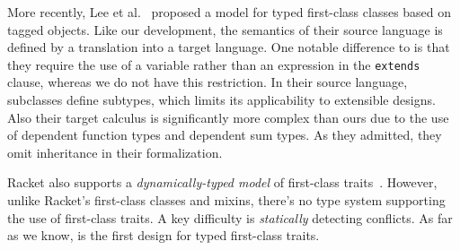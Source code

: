 More recently, Lee et al.~\citep{DBLP:conf/ecoop/LeeASP15} proposed a model for typed first-class
classes based on tagged objects. Like our development, the semantics
of their source language is defined by a translation into a target language.
One notable difference to \name is that they require the use of a variable
rather than an expression in the \lstinline{extends} clause, whereas we do not
have this restriction. In their source language, subclasses define subtypes,
which limits its applicability to extensible designs. Also their target calculus is significantly more complex
than ours due to the use of dependent function types and dependent sum types. As
they admitted, they omit inheritance in their formalization.

Racket also supports a \emph{dynamically-typed model} of first-class
traits~\citep{DBLP:conf/aplas/FlattFF06}. However, unlike Racket's first-class classes and
mixins, there's no type system supporting the use of first-class
traits. A key difficulty is \emph{statically} detecting conflicts.
As far as we know, \name is the first design for typed first-class traits.




